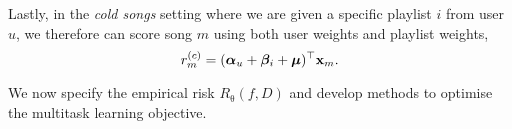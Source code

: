 Lastly, %
in the \emph{cold songs} setting where we are given a specific playlist $i$ from user $u$,
we therefore can score song $m$ using both user weights and playlist weights, \ie
\begin{equation}
\label{eq:cs}
r_m^{(c)} = ({\bm{\alpha}}_u + {\bm{\beta}}_i + \bm{\mu})^\top \mathbf{x}_m.
\end{equation}




We now specify the empirical risk $R_{\uptheta}(f, D)$ %
and develop methods to optimise the multitask learning objective.



